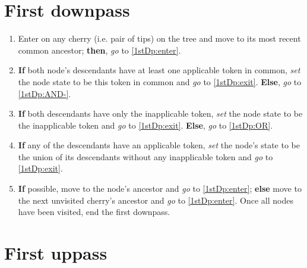 \documentclass[a4paper,12pt]{article}
\begin{document}

\section{First downpass} \label{1stDp}



\begin{enumerate}
    \item Enter on any cherry (i.e. pair of tips) on the tree and move to its most recent common ancestor; \textbf{then}, \textit{go} to \ref{1stDp:enter}.
    \item \label{1stDp:enter} \textbf{If} both node's descendants have at least one applicable token in common, \textit{set} the node state to be this token in common and \textit{go} to \ref{1stDp:exit}. \textbf{Else}, \textit{go} to \ref{1stDp:AND-}.
    \item \label{1stDp:AND-} \textbf{If} both descendants have only the inapplicable token, \textit{set} the node state to be the inapplicable token and \textit{go} to \ref{1stDp:exit}. \textbf{Else}, \textit{go} to \ref{1stDp:OR}.
    \item \label{1stDp:OR} \textbf{If} any of the descendants have an applicable token, \textit{set} the node's state to be the union of its descendants without any inapplicable token and \textit{go} to \ref{1stDp:exit}.
    \item \label{1stDp:exit} \textbf{If} possible, move to the node's ancestor and \textit{go} to \ref{1stDp:enter}; \textbf{else} move to the next unvisited cherry's ancestor and \textit{go} to \ref{1stDp:enter}. Once all nodes have been visited, end the first downpass.
\end{enumerate}

\section{First uppass} \label{1stUp}
\end{document}
